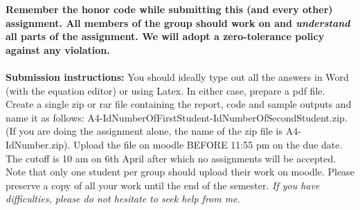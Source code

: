 \documentclass[11pt]{article}
\begin{document}
\maketitle

\textbf{Remember the honor code while submitting this (and every other) assignment. All members of the group should work on and \emph{understand} all parts of the assignment. We will adopt a \textbf{zero-tolerance policy} against any violation.}
\\
\\
\textbf{Submission instructions:} You should ideally type out all the answers in Word (with the equation editor) or using Latex. In either case, prepare a pdf file. Create a single zip or rar file containing the report, code and sample outputs and name it as follows: A4-IdNumberOfFirstStudent-IdNumberOfSecondStudent.zip. (If you are doing the assignment alone, the name of the zip file is A4-IdNumber.zip). Upload the file on moodle BEFORE 11:55 pm on the due date. The cutoff is 10 am on 6th April after which no assignments will be accepted. Note that only one student per group should upload their work on moodle. Please preserve a copy of all your work until the end of the semester. \emph{If you have difficulties, please do not hesitate to seek help from me.} 
\end{document}
